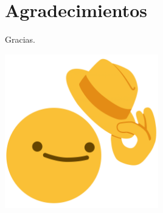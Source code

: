 \chapter*{Agradecimientos}
\label{sec:agradecimientos}
Gracias.
\begin{center}
\includegraphics[width=0.5\textwidth]{Figuras/Gracias}
\end{center}
